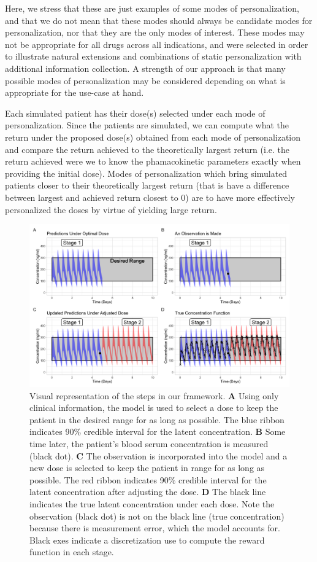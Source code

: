 Here, we stress that these are just examples of some modes of personalization, and that we do not mean that these modes should always be candidate modes for personalization, nor that they are the only modes of interest.  These modes may not be appropriate for all drugs across all indications, and were selected in order to illustrate natural extensions and combinations of static personalization with additional information collection. A strength of our approach is that many possible modes of personalization may be considered depending on what is appropriate for the use-case at hand.

Each simulated patient has their dose(s) selected under each mode of personalization.  Since the patients are simulated, we can compute what the return under the proposed dose(s) obtained from each mode of personalization and compare the return achieved to the theoretically largest return (i.e. the return achieved were we to know the phamacokinetic parameters exactly when providing the initial dose).  Modes of personalization which bring simulated patients closer to their theoretically largest return (that is have a difference between largest and achieved return closest to 0) are to have more effectively personalized the doses by virtue of yielding large return.



\begin{figure}
	\centering
	\includegraphics[width=1\linewidth]{figures/viz_of_process.png}
	\caption{
	Visual representation of the steps in our framework.	\textbf{A}  Using only clinical information, the model is used to select a dose to keep the patient in the desired range for as long as possible. The blue ribbon indicates 90\% credible interval for the latent concentration.  \textbf{B} Some time later, the patient's blood serum concentration is measured (black dot). \textbf{C}  The observation is incorporated into the model and a new dose is selected to keep the patient in range for as long as possible. The red ribbon indicates 90\% credible interval for the latent concentration after adjusting the dose. \textbf{D} The black line indicates the true latent concentration under each dose.  Note the observation (black dot) is not on the black line (true concentration) because there is measurement error, which the model accounts for.  Black exes indicate a discretization use to compute the reward function in each stage.
}
	\label{fig:processfiguresingle}
\end{figure}

